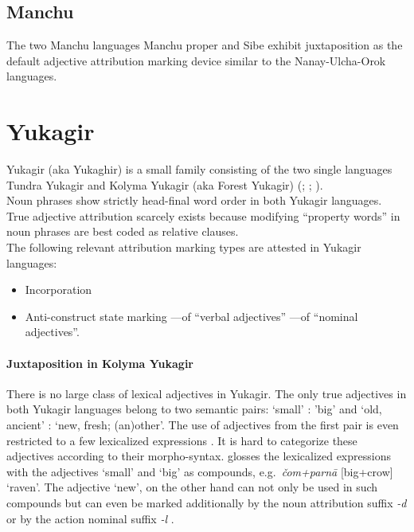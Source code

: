 \subsection{Manchu}
The two Manchu languages Manchu proper and Sibe exhibit juxtaposition as the default adjective attribution marking device similar to the Nanay-Ulcha-Orok languages.

\section{Yukagir}\label{yukagir synchr}
Yukagir (aka Yukaghir) is a small family consisting of the two single languages Tundra Yukagir and Kolyma Yukagir (aka Forest Yukagir)  (\citealt[223]{salminen2007}; \citealt[1–2]{maslova2003a}; \citealt[1]{maslova2003b}).\\

\noindent Noun phrases show strictly head-final word order in both Yukagir languages. True adjective attribution scarcely exists because modifying “property words” in noun phrases are best coded as relative clauses.\\

\noindent The following relevant attribution marking types are attested in Yukagir languages:
\begin{itemize}
\item Incorporation
\item Anti-construct state marking
	\subitem —of “verbal adjectives”
	\subitem —of “nominal adjectives”.
\end{itemize}

\paragraph{Juxtaposition in Kolyma Yukagir}
There is no large class of lexical adjectives in Yukagir. The only true adjectives in both Yukagir languages belong to two semantic pairs: ‘small’ : ’big’ and ‘old, ancient’ : ‘new, fresh; (an)other’. The use of adjectives from the first pair is even restricted to a few lexicalized expressions \cite[70–71]{maslova2003b}. It is hard to categorize these adjectives according to their morpho-syntax. \citet[71]{maslova2003b} glosses the lexicalized expressions with the adjectives ‘small’ and ‘big’ as compounds, e.g.~\textit{čom+parnā} [big+crow] ‘raven’. The adjective ‘new’, on the other hand can not only be used in such compounds but can even be marked additionally by the noun attribution suffix \textit{-d} or by the action nominal suffix \textit{-l} \cite[71]{maslova2003b}.

